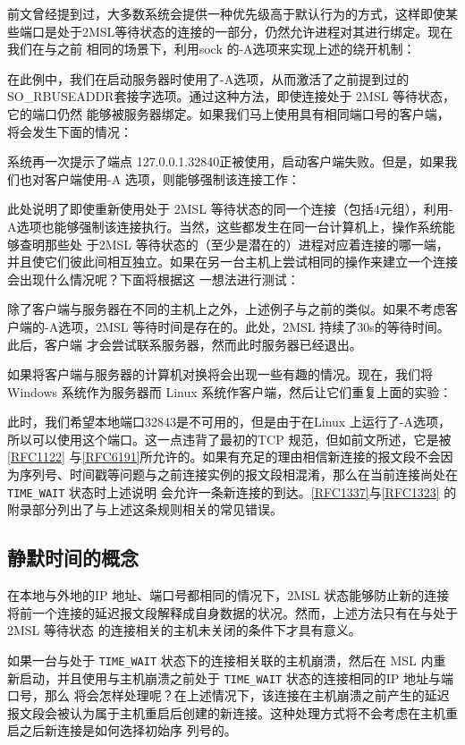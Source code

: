 前文曾经提到过，大多数系统会提供一种优先级高于默认行为的方式，这样即使某些端口是处于2MSL等待状态的连接的一部分，仍然允许进程对其进行绑定。现在我们在与之前
相同的场景下，利用sock 的-A选项来实现上述的绕开机制：

在此例中，我们在启动服务器时使用了-A选项，从而激活了之前提到过的SO\_RBUSEADDR套接字选项。通过这种方法，即使连接处于
2MSL 等待状态，它的端口仍然
能够被服务器绑定。如果我们马上使用具有相同端口号的客户端，将会发生下面的情况：

系统再一次提示了端点 127.0.0.1.32840正被使用，启动客户端失败。但是，如果我们也对客户端使用-A 选项，则能够强制该连接工作：

此处说明了即使重新使用处于 2MSL
等待状态的同一个连接（包括4元组），利用-A选项也能够强制该连接执行。当然，这些都发生在同一台计算机上，操作系统能够查明那些处
于2MSL
等待状态的（至少是潜在的）进程对应着连接的哪一端，并且使它们彼此间相互独立。如果在另一台主机上尝试相同的操作来建立一个连接会出现什么情况呢？下面将根据这
一想法进行测试：

除了客户端与服务器在不同的主机上之外，上述例子与之前的类似。如果不考虑客户端的-A选项，2MSL 等待时间是存在的。此处，2MSL
持续了30s的等待时间。此后，客户端
才会尝试联系服务器，然而此时服务器已经退出。

如果将客户端与服务器的计算机对换将会出现一些有趣的情况。现在，我们将 Windows
系统作为服务器而 Linux 系统作客户端，然后让它们重复上面的实验：

此时，我们希望本地端口32843是不可用的，但是由于在Linux 上运行了-A选项，所以可以使用这个端口。这一点违背了最初的TCP
规范，但如前文所述，它是被\href{https://www.rfc-editor.org/rfc/rfc1122}{[RFC1122]}
与\href{https://www.rfc-editor.org/rfc/rfc6191}{[RFC6191]}所允许的。如果有充足的理由相信新连接的报文段不会因为序列号、时间戳等问题与之前连接实例的报文段相混淆，那么在当前连接尚处在
\verb|TIME_WAIT| 状态时上述说明
会允许一条新连接的到达。\href{https://www.rfc-editor.org/rfc/rfc1337}{[RFC1337]}与\href{https://www.rfc-editor.org/rfc/rfc1323}{[RFC1323]}
的附录部分列出了与上述这条规则相关的常见错误。
\subsection{静默时间的概念}
在本地与外地的IP 地址、端口号都相同的情况下，2MSL
状态能够防止新的连接将前一个连接的延迟报文段解释成自身数据的状况。然而，上述方法只有在与处于 2MSL 等待状态
的连接相关的主机未关闭的条件下才具有意义。

如果一台与处于 \verb|TIME_WAIT| 状态下的连接相关联的主机崩溃，然后在 MSL 内重新启动，并且使用与主机崩溃之前处于
\verb|TIME_WAIT| 状态的连接相同的IP 地址与端口号，那么
将会怎样处理呢？在上述情况下，该连接在主机崩溃之前产生的延迟报文段会被认为属于主机重启后创建的新连接。这种处理方式将不会考虑在主机重启之后新连接是如何选择初始序
列号的。

